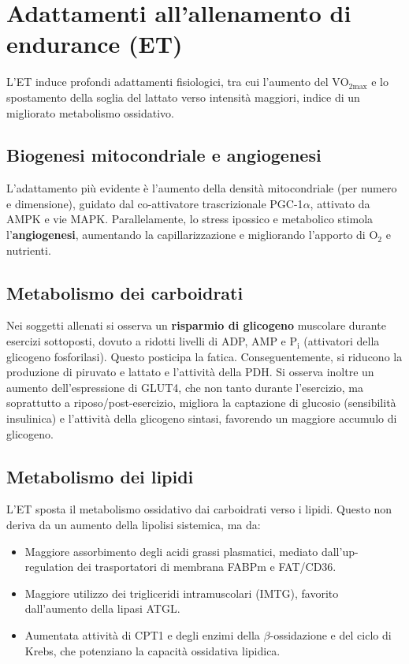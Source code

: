 \documentclass[12pt,a4paper]{report}
\begin{document}
\section{Adattamenti all'allenamento di endurance (ET)}
L'ET induce profondi adattamenti fisiologici, tra cui l'aumento del \(\mathrm{VO_{2max}}\) e lo spostamento della soglia del lattato verso intensità maggiori, indice di un migliorato metabolismo ossidativo.

\subsection{Biogenesi mitocondriale e angiogenesi}
L'adattamento più evidente è l'aumento della densità mitocondriale (per numero e dimensione), guidato dal co-attivatore trascrizionale PGC-1\(\alpha\), attivato da AMPK e vie MAPK. Parallelamente, lo stress ipossico e metabolico stimola l'\textbf{angiogenesi}, aumentando la capillarizzazione e migliorando l'apporto di \(\mathrm{O_2}\) e nutrienti.

\subsection{Metabolismo dei carboidrati}
Nei soggetti allenati si osserva un \textbf{risparmio di glicogeno} muscolare durante esercizi sottoposti, dovuto a ridotti livelli di ADP, AMP e \(\mathrm{P_i}\) (attivatori della glicogeno fosforilasi). Questo posticipa la fatica. Conseguentemente, si riducono la produzione di piruvato e lattato e l'attività della PDH.
Si osserva inoltre un aumento dell'espressione di GLUT4, che non tanto durante l'esercizio, ma soprattutto a riposo/post-esercizio, migliora la captazione di glucosio (sensibilità insulinica) e l'attività della glicogeno sintasi, favorendo un maggiore accumulo di glicogeno.

\subsection{Metabolismo dei lipidi}
L'ET sposta il metabolismo ossidativo dai carboidrati verso i lipidi. Questo non deriva da un aumento della lipolisi sistemica, ma da:
\begin{itemize}
\item Maggiore assorbimento degli acidi grassi plasmatici, mediato dall'up-regulation dei trasportatori di membrana FABPm e FAT/CD36.
\item Maggiore utilizzo dei trigliceridi intramuscolari (IMTG), favorito dall'aumento della lipasi ATGL.
\item Aumentata attività di CPT1 e degli enzimi della \(\beta\)-ossidazione e del ciclo di Krebs, che potenziano la capacità ossidativa lipidica.
\end{itemize}
\end{document}
